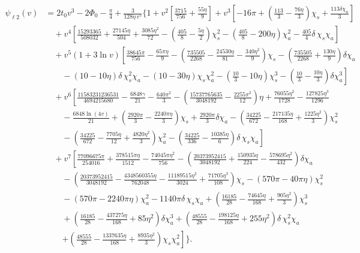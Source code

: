 {\footnotesize
{\allowdisplaybreaks
\begin{align}
 \psi_{\ell 2} (v) &= 2 t_0 v^3 - 2\Phi_0 - \frac{\pi}{4} +
\frac{3}{128 \eta \, v^5} \Bigg\{ 1 + v^2
\left[\frac{3715}{756}+\frac{55 \eta }{9}  \right] + v^3 \left[ 
 -16 \pi +\left( \frac{113}{3}-\frac{76 \eta }{3} \right) \chi_s
+\frac{113 \delta  \chi _a}{3} \nonumber \right] \\
& \quad + v^4 \left[ \frac{15293365}{508032}+\frac{27145 \eta
}{504}+\frac{3085 \eta ^2}{72} - \left( \frac{405}{8}-\frac{5 \eta
}{2} \right) \chi_s^2 - \left( \frac{405}{8}-200 \eta \right) \chi_a^2
-\frac{405  }{4} \delta \, \chi_s \chi_a \right] \nonumber \\
& \quad + v^5 \left( 1+ 3  \ln v \right) \left[ \frac{38645
\pi }{756}-\frac{65 \pi  \eta }{9} - \left(
\frac{735505}{2268}-\frac{24530 \eta }{81}-\frac{340 \eta ^2}{9}
\right) \chi_s - \left( \frac{735505}{2268}+\frac{130 \eta }{9}
\right) \delta \chi_a \nonumber \right. \\
& \qquad - \left. (10-10 \eta) \delta \, \chi_s^2 \chi_a - (10-30
\eta) \chi_s \chi_a^2 - \left( \frac{10}{3}-10 \eta \right) \chi_s^3 -
\left( \frac{10}{3}-\frac{10 \eta }{3} \right) \delta \chi_a^3
\right] \nonumber \\
& \quad + v^6 \left[  \frac{11583231236531}{4694215680}-\frac{6848
\gamma}{21}-\frac{640 \pi ^2}{3}-\left(
\frac{15737765635}{3048192}-\frac{2255 \pi ^2}{12} \right) \eta
+ \frac{76055 \eta ^2}{1728} - \frac{127825 \eta ^3}{1296} 
\right. \nonumber \\
& \qquad -\frac{6848  \ln(4v)}{21} + \left( \frac{2920 \pi
}{3}-\frac{2240 \pi  \eta }{3} \right) \chi_s + \frac{2920 \pi 
}{3}\delta \chi_a - \left( \frac{34225}{672}-\frac{217135 \eta
}{168}+\frac{1225 \eta ^2}{3} \right) \chi_s^2 \nonumber \\
& \qquad - \left. \left( \frac{34225}{672}-\frac{7705 \eta
}{12}+\frac{4820 \eta ^2}{3} \right) \chi_a^2 
- \left( \frac{34225}{336}-\frac{10385 \eta }{6} \right) \delta \,
\chi_s \chi_a
\right] \nonumber \\
& \quad + v^7 \left[  \frac{77096675 \pi }{254016}+\frac{378515 \pi 
\eta }{1512}-\frac{74045 \pi  \eta ^2}{756} -
\left( \frac{20373952415}{3048192}+\frac{150935 \eta
}{224}-\frac{578695 \eta ^2}{432} \right) \delta \chi_a
\right. \nonumber \\
& \qquad - \left( \frac{20373952415}{3048192}-\frac{4348560355 \eta
}{762048}-\frac{11189515 \eta ^2}{3024}+\frac{71705 \eta ^3}{108} 
\right) \chi_s - (570 \pi -40 \pi  \eta) \chi_s^2 \nonumber \\
& \qquad - (570 \pi -2240 \pi  \eta) \chi_a^2 -1140 \pi  \delta \,
\chi_s \chi_a + \left( \frac{16185}{28}-\frac{74645 \eta
}{168}+\frac{905 \eta ^2}{3} \right) \chi_s^3 \nonumber \\
& \qquad + \left( \frac{16185}{28}-\frac{437275 \eta }{168}+85 \eta ^2
\right) \delta \chi_a^3 + \left( \frac{48555}{28}-\frac{198125 \eta
}{168}+255 \eta ^2 \right) \delta \, \chi_s^2 \chi_a \nonumber \\
& \qquad \left. + \left( \frac{48555}{28}-\frac{1337635 \eta
}{168}+\frac{8935 \eta ^2}{3} \right) \chi_s \chi_a^2  \right] \Bigg
\}.
\end{align}
}}%
